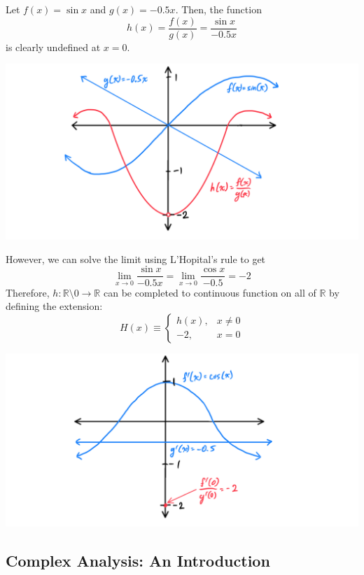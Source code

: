     \begin{example}
      Let $f(x) = \sin{x}$ and $g(x) = -0.5x$. Then, the function 
      \[h(x) = \frac{f(x)}{g(x)} = \frac{\sin{x}}{-0.5x}\]
      is clearly undefined at $x = 0$. 
      \begin{center}
          \includegraphics[scale=0.25]{img/LHopital_Example_1.PNG}
      \end{center}
      However, we can solve the limit using L'Hopital's rule to get
      \[\lim_{x \rightarrow 0} \frac{\sin{x}}{-0.5x} = \lim_{x \rightarrow 0} \frac{\cos{x}}{-0.5} = -2\]
      Therefore, $h: \mathbb{R} \setminus 0 \longrightarrow \mathbb{R}$ can be completed to continuous function on all of $\mathbb{R}$ by defining the extension: 
      \[H(x) \equiv \begin{cases}
      h(x), & x \neq 0 \\
      -2, & x = 0
      \end{cases}\]
      \begin{center}
      \includegraphics[scale=0.25]{img/LHopital_Example_2.PNG}
      \end{center}
    \end{example}

  \subsection{Complex Analysis: An Introduction}

